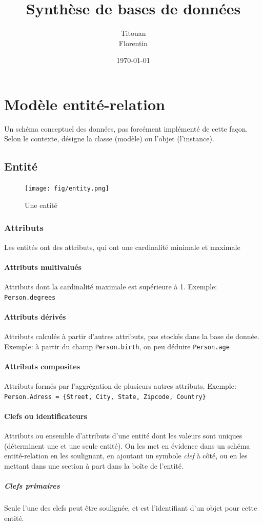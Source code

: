 \documentclass[a4paper]{article}
\author{Titouan \bsc{Christophe}\\Florentin \bsc{Hennecker}}
\title{Synthèse de bases de données}
\date{\today}
\begin{document}
\maketitle
\tableofcontents

\section{Modèle entité-relation}
Un schéma conceptuel des données, pas forcément implémenté de cette façon.
Selon le contexte, désigne la classe (modèle) ou l'objet (l'instance).

\subsection{Entité}
\begin{figure}[H]
    \center
    \texttt{[image: fig/entity.png]}
    \caption{Une entité}
\end{figure}

\subsubsection{Attributs}
Les entités ont des attributs, qui ont une cardinalité minimale et maximale

\paragraph{Attributs multivalués}
Attributs dont la cardinalité maximale est supérieure à 1.
Exemple: \texttt{Person.degrees}

\paragraph{Attributs dérivés}
Attributs calculés à partir d'autres attributs, pas stockés dans la base de donnée.
Exemple: à partir du champ \texttt{Person.birth}, on peu déduire \texttt{Person.age}

\paragraph{Attributs composites}
Attributs formés par l'aggrégation de plusieurs autres attributs.
Exemple: \texttt{Person.Adress = \{Street, City, State, Zipcode, Country\}}

\paragraph{Clefs ou identificateurs}
Attributs ou ensemble d'attributs d'une entité dont les valeurs sont uniques
(déterminent une et une seule entité). On les met en évidence dans un schéma
entité-relation en les soulignant, en ajoutant un symbole \textit{clef} à côté,
ou en les mettant dans une section à part dans la boîte de l'entité.
\subparagraph{Clefs primaires}
Seule l'une des clefs peut être soulignée, et est l'identifiant d'un objet pour
cette entité.
\end{document}
